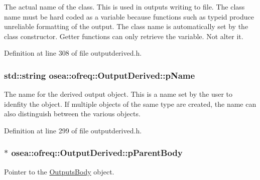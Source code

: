 The actual name of the class. This is used in outputs writing to file. The class name must be hard coded as a variable because functions such as typeid produce unreliable formatting of the output. The class name is automatically set by the class constructor. Getter functions can only retrieve the variable. Not alter it. 



Definition at line 308 of file outputderived.\-h.

\hypertarget{classosea_1_1ofreq_1_1_output_derived_a4ab81d265885b1c9fb9b4596dc9cd093}{
\subsubsection[{p\-Name}]{\setlength{\rightskip}{0pt plus 5cm}std\-::string osea\-::ofreq\-::\-Output\-Derived\-::p\-Name\hspace{0.3cm}{\ttfamily [protected]}}}\label{classosea_1_1ofreq_1_1_output_derived_a4ab81d265885b1c9fb9b4596dc9cd093}


The name for the derived output object. This is a name set by the user to idenfity the object. If multiple objects of the same type are created, the name can also distinguish between the various objects. 



Definition at line 299 of file outputderived.\-h.

\hypertarget{classosea_1_1ofreq_1_1_output_derived_a62d01bedaed33feb53c4108eaf8e4baf}{
\subsubsection[{p\-Parent\-Body}]{$\ast$ osea\-::ofreq\-::\-Output\-Derived\-::p\-Parent\-Body\hspace{0.3cm}{\ttfamily [protected]}}}\label{classosea_1_1ofreq_1_1_output_derived_a62d01bedaed33feb53c4108eaf8e4baf}


Pointer to the \hyperlink{classosea_1_1ofreq_1_1_outputs_body}{Outputs\-Body} object. 

